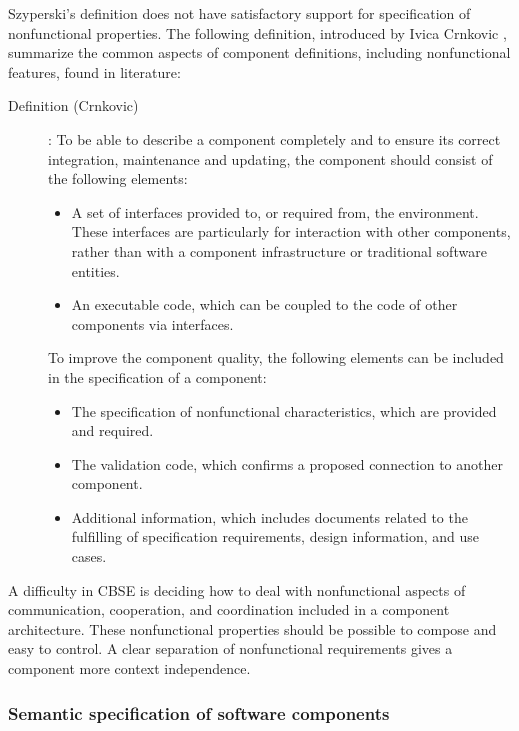 Szyperski's definition does not have satisfactory support for specification of
nonfunctional properties. 
The following definition, introduced by Ivica Crnkovic \cite{IVICA2002}, 
summarize the common aspects of component definitions, including 
nonfunctional features, found in literature:
\begin{description} 
\item [Definition (Crnkovic)]: 
To be able to describe a component completely and to ensure its correct
integration, maintenance and updating, the component should consist of
the following elements:
	\begin{itemize}
	\item A set of interfaces provided to, or required from, 
	the environment.
	These interfaces are particularly for interaction with other components,
	rather than with a component infrastructure or traditional software
	entities.
	\item An executable code, which can be coupled to the code of other 
	components via interfaces.
	\end{itemize}
	To improve the component quality, the following elements can be included
	in the specification of a component:
	\begin{itemize}
	\item The specification of nonfunctional characteristics, which are 
	provided and required.	
	\item The validation code, which confirms a proposed connection to 
	another component.
	\item Additional information, which includes documents related to the 
	fulfilling of specification requirements, design information, and use 
	cases.
	\end{itemize}
\end{description}

\noindent
A difficulty in CBSE is deciding how to deal with nonfunctional aspects
of communication, cooperation, and coordination included in a component
architecture.
These nonfunctional properties should be possible to compose and easy to
control.
A clear separation of nonfunctional requirements gives a component more
context independence.


\subsubsection{Semantic specification of software components}

